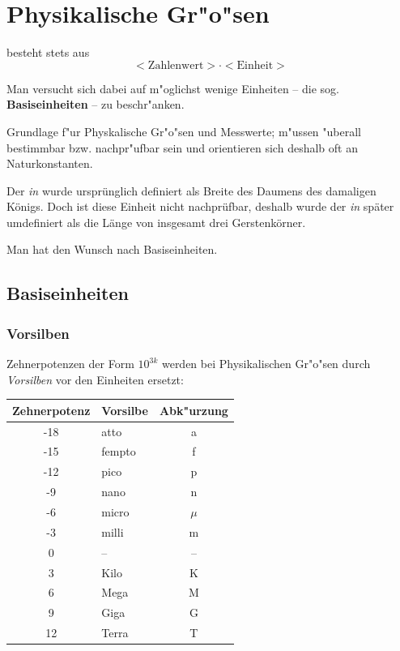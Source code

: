 \chapter{Physikalische Gr"o"sen}

\begin{Def}[Physikalische Gr"o"se]
   besteht stets aus
     $$
     <\text{Zahlenwert}> \cdot <\text{Einheit}>
     $$
\end{Def}
Man versucht sich dabei auf m"oglichst wenige Einheiten -- die
sog. \textbf{Basiseinheiten} -- zu beschr"anken.
\begin{Def}
   Grundlage f"ur Physkalische Gr"o"sen und Messwerte; m"ussen "uberall
   bestimmbar bzw. nachpr"ufbar sein und orientieren sich deshalb oft
   an Naturkonstanten.
\end{Def}

\begin{Beispiel}
 Der \emph{in} wurde ursprünglich definiert als Breite des Daumens des 
damaligen Königs.  Doch ist diese Einheit nicht nachprüfbar, deshalb wurde 
der \emph{in} später umdefiniert als die Länge von insgesamt drei Gerstenkörner.

Man hat den Wunsch nach Basiseinheiten.
\end{Beispiel}








\section{Basiseinheiten}



\subsection{Vorsilben}

Zehnerpotenzen der Form $10^{3k}$ werden bei Physikalischen Gr"o"sen durch
\emph{Vorsilben} vor den Einheiten ersetzt:
\begin{center}
\begin{tabular}{c l c}
\toprule
 Zehnerpotenz & Vorsilbe & Abk"urzung \\
 \midrule
-18 & atto & a\\ 
-15 & fempto & f \\ 
-12 & pico & p  \\
-9  & nano & n  \\
-6  & micro & $\mu$  \\
-3 & milli & m  \\
0  & -- & --  \\
3  & Kilo& K  \\
6  & Mega & M  \\
9  & Giga & G  \\
12 & Terra & T \\
\bottomrule
\end{tabular}
\end{center}







